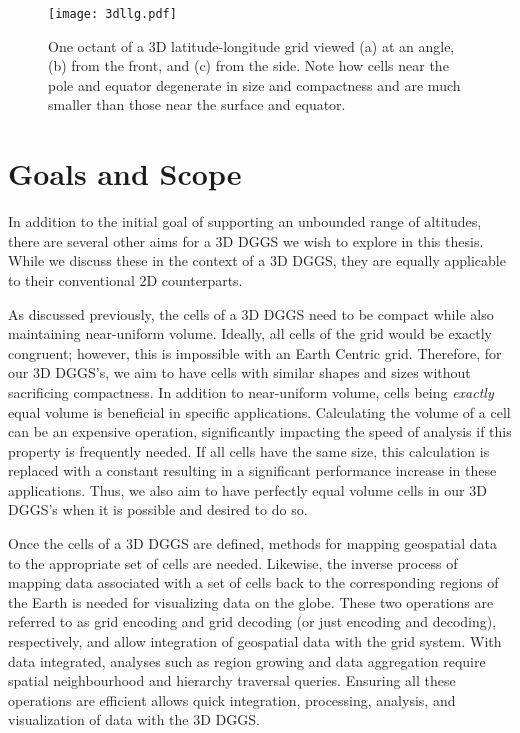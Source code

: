 \begin{figure}[htb!]
	\centering
	\texttt{[image: 3dllg.pdf]}
	\caption[Different views of a 3D latitude-longitude grid]{
		One octant of a 3D latitude-longitude grid viewed (a) at an angle, (b) from the front, and (c) from the side.
		Note how cells near the pole and equator degenerate in size and compactness and are much smaller than those near the surface and equator.
	}
	\label{fig:3dllg}
\end{figure}


\section{Goals and Scope} \label{chap:1:goals}
In addition to the initial goal of supporting an unbounded range of altitudes, there are several other aims for a 3D DGGS we wish to explore in this thesis.
While we discuss these in the context of a 3D DGGS, they are equally applicable to their conventional 2D counterparts.


As discussed previously, the cells of a 3D DGGS need to be compact while also maintaining near-uniform volume.
Ideally, all cells of the grid would be exactly congruent; however, this is impossible with an Earth Centric grid.
Therefore, for our 3D DGGS's, we aim to have cells with similar shapes and sizes without sacrificing compactness.
In addition to near-uniform volume, cells being \textit{exactly} equal volume is beneficial in specific applications.
Calculating the volume of a cell can be an expensive operation, significantly impacting the speed of analysis if this property is frequently needed.
If all cells have the same size, this calculation is replaced with a constant resulting in a significant performance increase in these applications.
Thus, we also aim to have perfectly equal volume cells in our 3D DGGS's when it is possible and desired to do so.


Once the cells of a 3D DGGS are defined, methods for mapping geospatial data to the appropriate set of cells are needed.
Likewise, the inverse process of mapping data associated with a set of cells back to the corresponding regions of the Earth is needed for visualizing data on the globe.
These two operations are referred to as grid encoding and grid decoding (or just encoding and decoding), respectively, and allow integration of geospatial data with the grid system.
With data integrated, analyses such as region growing and data aggregation require spatial neighbourhood and hierarchy traversal queries.
Ensuring all these operations are efficient allows quick integration, processing, analysis, and visualization of data with the 3D DGGS.


